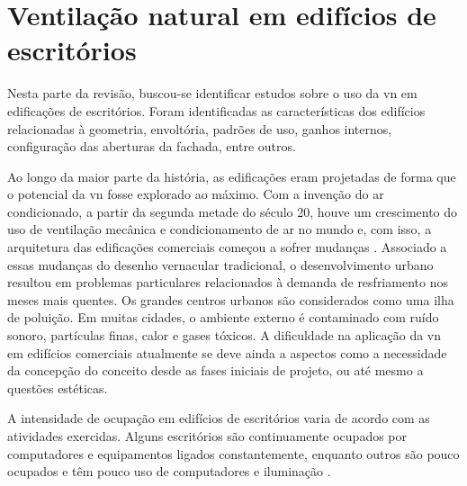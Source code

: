 \documentclass[brazil,hardcopy,openany]{ufscthesis} %
\begin{document}
\section{Ventilação natural em edifícios de escritórios}

Nesta parte da revisão, buscou-se identificar estudos sobre o uso da \acrshort{vn} em edificações de escritórios. Foram identificadas as características dos edifícios relacionadas à geometria, envoltória, padrões de uso, ganhos internos, configuração das aberturas da fachada, entre outros.

Ao longo da maior parte da história, as edificações eram projetadas de forma que o potencial da \acrshort{vn} fosse explorado ao máximo. Com a invenção do ar condicionado, a partir da segunda metade do século 20, houve um crescimento do uso de ventilação mecânica e condicionamento de ar no mundo e, com isso, a arquitetura das edificações comerciais começou a sofrer mudanças \cite{CarrilhodaGraca2016}. Associado a essas mudanças do desenho vernacular tradicional, o desenvolvimento urbano resultou em problemas particulares relacionados à demanda de resfriamento nos meses mais quentes. Os grandes centros urbanos são considerados como uma ilha de poluição. Em muitas cidades, o ambiente externo é contaminado com ruído sonoro, partículas finas, calor e gases tóxicos. A dificuldade na aplicação da \acrshort{vn} em edifícios comerciais atualmente se deve ainda a aspectos como a necessidade da concepção do conceito desde as fases iniciais de projeto, ou até mesmo a questões estéticas.

A intensidade de ocupação em edifícios de escritórios varia de acordo com as atividades exercidas. Alguns escritórios são continuamente ocupados por computadores e equipamentos ligados constantemente, enquanto outros são pouco ocupados e têm pouco uso de computadores e iluminação \cite{Elharidi2018}.
\end{document}
